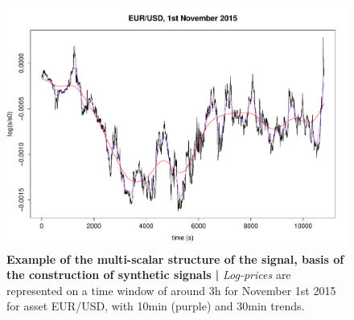 

\begin{figure}%
\centering
\includegraphics[width=\textwidth]{Figures/SyntheticData/ex_filtering}
\caption[Example of the multi-scalar structure of the signal]{\textbf{Example of the multi-scalar structure of the signal, basis of the construction of synthetic signals | } \emph{Log-prices} are represented on a time window of around 3h for November 1st 2015 for asset EUR/USD, with 10min (purple) and 30min trends.}
\label{fig:example_signal}
\end{figure}



